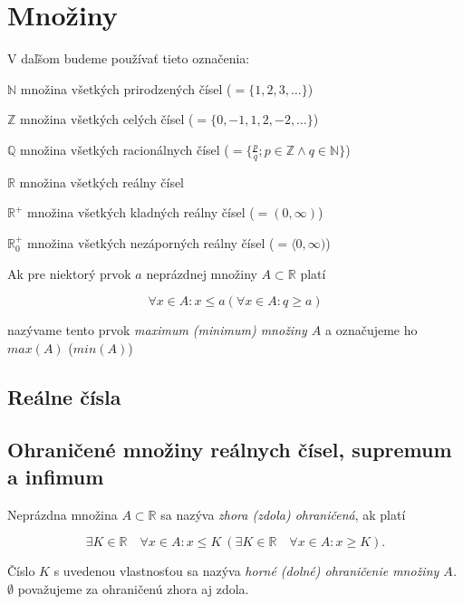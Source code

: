 \chapter{Množiny}%

V daľšom budeme používať tieto označenia:

$\mathbb{N}$ množina všetkých prirodzených čísel ($= \{ 1, 2, 3, \ldots \}$)

$\mathbb{Z}$ množina všetkých celých čísel ($= \{ 0, -1, 1, 2, -2, \ldots \}$)

$\mathbb{Q}$ množina všetkých racionálnych čísel
  ($= \{ \frac{p}{q}; p \in \mathbb{Z} \land q \in \mathbb{N} \}$)

$\mathbb{R}$ množina všetkých reálny čísel

$\mathbb{R}^+$ množina všetkých kladných reálny čísel ($= ( 0, \infty )$)

$\mathbb{R}^+_0$ množina všetkých nezáporných reálny čísel
  ($= \langle 0, \infty )$)

Ak pre niektorý prvok $a$ neprázdnej množiny $A \subset \mathbb{R}$ platí

$$\forall x \in A : x \leq a (\forall x \in A: q \geq a)$$

nazývame tento prvok \textit{maximum (minimum) množiny $A$} a označujeme ho
$max(A)$ ($min(A)$)

\section{Reálne čísla}

\begin{enumerate}[resume]
\end{enumerate}

\section{Ohraničené množiny reálnych čísel, supremum a infimum}

Neprázdna množina $A \subset \mathbb{R}$ sa nazýva \textit{zhora (zdola)
ohraničená}, ak platí

$$
\exists K \in  \mathbb{R} \quad \forall x \in A: x \leq K \:
(\exists K \in \mathbb{R} \quad \forall x \in A: x \geq K).
$$

Číslo $K$ s uvedenou vlastnosťou sa nazýva \textit{horné (dolné)
ohraničenie množiny $A$.} $\emptyset$ považujeme za ohraničenú zhora aj zdola.

